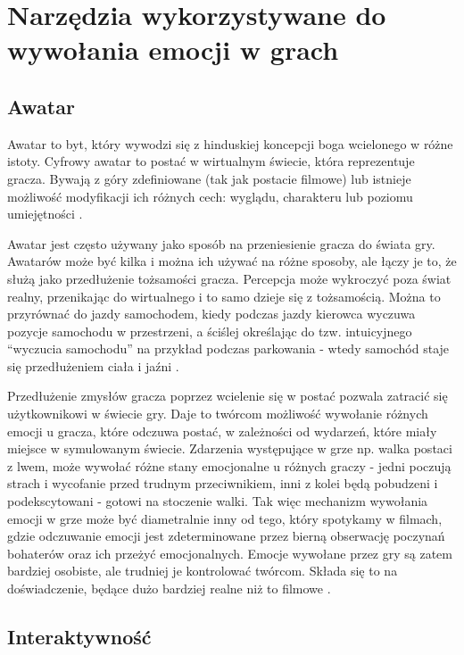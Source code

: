 \section{Narzędzia wykorzystywane do wywołania emocji w grach}

\subsection{Awatar}

Awatar to byt, który wywodzi się z hinduskiej koncepcji boga wcielonego w różne istoty. Cyfrowy awatar to postać w wirtualnym świecie, która reprezentuje gracza. Bywają z góry zdefiniowane (tak jak postacie filmowe) lub istnieje możliwość  modyfikacji ich różnych cech: wyglądu, charakteru lub poziomu umiejętności \citep{glossary}.

Awatar jest często używany jako sposób na przeniesienie gracza do świata gry. Awatarów może być kilka i można ich używać na różne sposoby, ale łączy je to, że służą jako przedłużenie tożsamości gracza. Percepcja może wykroczyć poza świat realny, przenikając do wirtualnego i to samo dzieje się z tożsamością. Można to przyrównać do jazdy samochodem, kiedy podczas jazdy kierowca wyczuwa pozycje samochodu w przestrzeni, a ściślej określając do tzw. intuicyjnego ``wyczucia samochodu'' na przykład podczas parkowania - wtedy samochód staje się przedłużeniem ciała i jaźni \citep{gamefeel}.

Przedłużenie zmysłów gracza poprzez wcielenie się w postać pozwala zatracić się użytkownikowi w świecie gry. Daje to twórcom możliwość wywołanie różnych emocji u gracza, które odczuwa postać, w zależności od wydarzeń, które miały miejsce w symulowanym świecie. Zdarzenia występujące w grze np. walka postaci z lwem, może wywołać różne stany emocjonalne u różnych graczy - jedni poczują strach i wycofanie przed trudnym przeciwnikiem, inni z kolei będą pobudzeni i podekscytowani - gotowi na stoczenie walki. Tak więc mechanizm wywołania emocji w grze może być diametralnie inny od tego, który spotykamy w filmach, gdzie odczuwanie emocji jest zdeterminowane przez bierną obserwację poczynań bohaterów oraz ich przeżyć emocjonalnych. Emocje wywołane przez gry są zatem bardziej osobiste, ale trudniej je kontrolować twórcom. Składa się to na doświadczenie, będące dużo bardziej realne niż to filmowe \citep{button}.

\subsection{Interaktywność}

